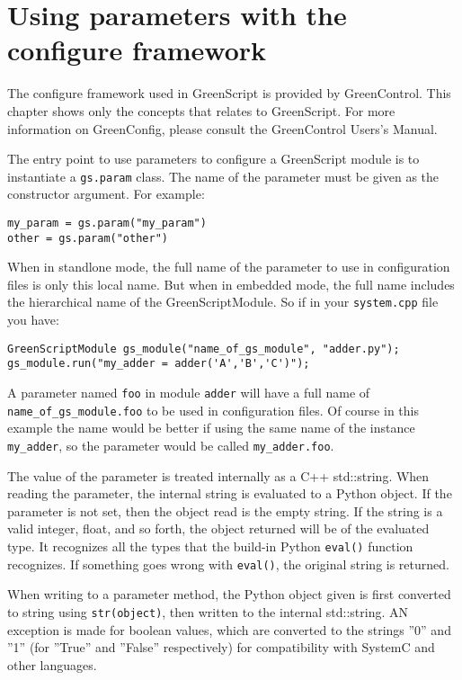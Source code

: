\documentclass[12pt,oneside]{gsbook}
\begin{document}
\chapter{Using parameters with the configure framework}
\label{PARAM}

The configure framework used in GreenScript is provided by
GreenControl. This chapter shows only the concepts that relates to
GreenScript. For more information on GreenConfig, please consult
the GreenControl Users's Manual.

The entry point to use parameters to configure a GreenScript module is
to instantiate a \texttt{gs.param} class. The name of the parameter
must be given as the constructor argument. For example:

\begin{lstlisting}
my_param = gs.param("my_param")
other = gs.param("other")
\end{lstlisting}

When in standlone mode, the full name of the parameter to use in
configuration files is only this local name. But when in embedded
mode, the full name includes the hierarchical name of the
GreenScriptModule. So if in your \texttt{system.cpp} file you have:

\begin{lstlisting}
GreenScriptModule gs_module("name_of_gs_module", "adder.py");
gs_module.run("my_adder = adder('A','B','C')");
\end{lstlisting}

A parameter named \texttt{foo} in module \texttt{adder} will have a
full name of \texttt{name\_of\_gs\_module.foo} to be used in
configuration files. Of course in this example the name would be
better if using the same name of the instance \texttt{my\_adder}, so
the parameter would be called \texttt{my\_adder.foo}.

The value of the parameter is treated internally as a C++
std::string. When reading the parameter, the internal string is evaluated
to a Python object. If the
parameter is not set, then the object read is the empty string. If the
string is a valid integer, float, and so forth, the object returned
will be of the evaluated type. It recognizes all the types that the
build-in Python \texttt{eval()} function recognizes. If something goes
wrong with \texttt{eval()}, the original string is returned.

When writing to a parameter method,
the Python object given is first converted to string using
\texttt{str(object)}, then written to the internal std::string.  AN exception
is made for boolean values, which are converted to the strings ''0'' and
''1'' (for ''True'' and ''False'' respectively) for compatibility with
SystemC and other languages.
\end{document}
